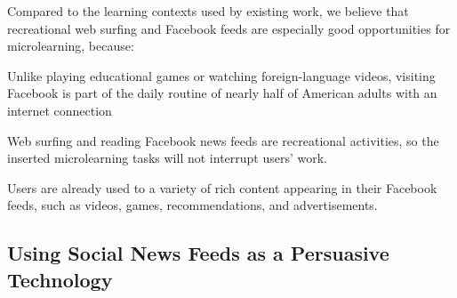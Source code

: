 \documentclass{sigchi}
\begin{document}
Compared to the learning contexts used by existing work, we believe that recreational web surfing and Facebook feeds are especially good opportunities for microlearning, because:

\begin{compactitem}
\item Unlike playing educational games or watching foreign-language videos, visiting Facebook is part of the daily routine of nearly half of American adults with an internet connection \cite{socialmediaupdate} %
\item Web surfing and reading Facebook news feeds are recreational activities, so the inserted microlearning tasks will not interrupt users' work.
\item Users are already used to a variety of rich content appearing in their Facebook feeds, such as videos, games, recommendations, and advertisements.
\end{compactitem}




\subsection{Using Social News Feeds as a Persuasive Technology}
\end{document}

